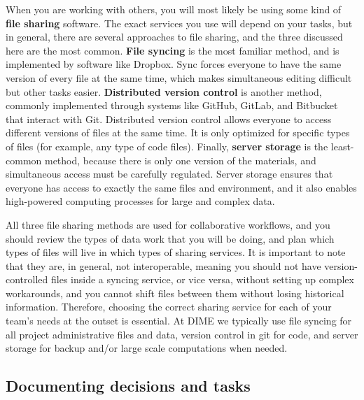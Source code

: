 When you are working with others, you will most likely be using
some kind of \textbf{file sharing} software.
The exact services you use will depend on your tasks,
but in general, there are several approaches to file sharing,
and the three discussed here are the most common.
\textbf{File syncing} is the most familiar method,
and is implemented by software like Dropbox.
Sync forces everyone to have the same version of every file at the same time,
which makes simultaneous editing difficult but other tasks easier.
\textbf{Distributed version control} is another method,
commonly implemented through systems like GitHub, GitLab, and Bitbucket
that interact with Git.
Distributed version control allows everyone
to access different versions of files at the same time.
It is only optimized for specific types of files
(for example, any type of code files).
Finally, \textbf{server storage} is the least-common method,
because there is only one version of the materials,
and simultaneous access must be carefully regulated.
Server storage ensures that everyone has access
to exactly the same files and environment, and it also enables
high-powered computing processes for large and complex data.

All three file sharing methods are used for collaborative workflows,
and you should review the types of data work
that you will be doing, and plan which types of files
will live in which types of sharing services.
It is important to note that they are, in general, not interoperable,
meaning you should not have version-controlled files inside a syncing service,
or vice versa, without setting up complex workarounds,
and you cannot shift files between them without losing historical information.
Therefore, choosing the correct sharing service for each of your team's needs at the outset is essential.
At DIME we typically use file syncing for all project administrative files and data,
version control in git for code,
and server storage for backup and/or large scale computations when needed.

\subsection{Documenting decisions and tasks}

